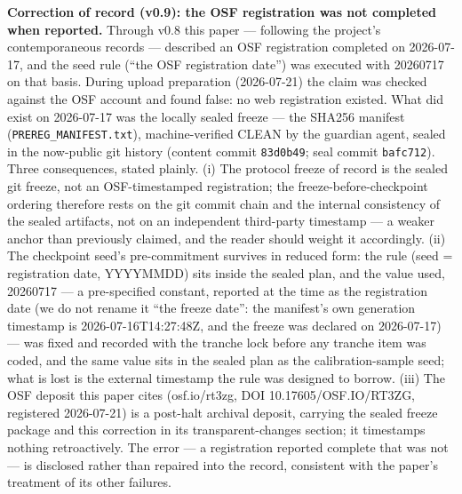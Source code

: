 \textbf{Correction of record (v0.9): the OSF registration was not completed when reported.} Through v0.8 this paper --- following the project's contemporaneous records --- described an OSF registration completed on 2026-07-17, and the seed rule (``the OSF registration date'') was executed with 20260717 on that basis. During upload preparation (2026-07-21) the claim was checked against the OSF account and found false: no web registration existed. What did exist on 2026-07-17 was the locally sealed freeze --- the SHA256 manifest (\texttt{PREREG\_MANIFEST.txt}), machine-verified CLEAN by the guardian agent, sealed in the now-public git history (content commit \texttt{83d0b49}; seal commit \texttt{bafc712}). Three consequences, stated plainly. (i) The protocol freeze of record is the sealed git freeze, not an OSF-timestamped registration; the freeze-before-checkpoint ordering therefore rests on the git commit chain and the internal consistency of the sealed artifacts, not on an independent third-party timestamp --- a weaker anchor than previously claimed, and the reader should weight it accordingly. (ii) The checkpoint seed's pre-commitment survives in reduced form: the rule (seed = registration date, YYYYMMDD) sits inside the sealed plan, and the value used, 20260717 --- a pre-specified constant, reported at the time as the registration date (we do not rename it ``the freeze date'': the manifest's own generation timestamp is 2026-07-16T14:27:48Z, and the freeze was declared on 2026-07-17) --- was fixed and recorded with the tranche lock before any tranche item was coded, and the same value sits in the sealed plan as the calibration-sample seed; what is lost is the external timestamp the rule was designed to borrow. (iii) The OSF deposit this paper cites (osf.io/rt3zg, DOI 10.17605/OSF.IO/RT3ZG, registered 2026-07-21) is a post-halt archival deposit, carrying the sealed freeze package and this correction in its transparent-changes section; it timestamps nothing retroactively. The error --- a registration reported complete that was not --- is disclosed rather than repaired into the record, consistent with the paper's treatment of its other failures.

